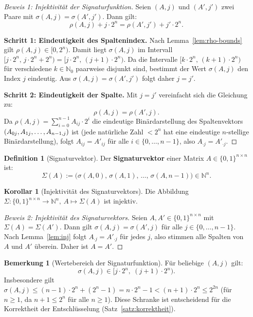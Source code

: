 ﻿\documentclass[a4paper,12pt]{scrreprt}
\theoremstyle{definition}
\newtheorem{definition}{Definition}[section]
\newtheorem{bemerkung}{Bemerkung}[section]
\newtheorem{korollar}{Korollar}[section]
\begin{document}
\begin{proof}[Beweis 1: Injektivität der Signaturfunktion]
	Seien $(A, j)$ und $(A', j')$ zwei Paare mit $\sigma(A,j) = \sigma(A',j')$. Dann gilt:
	\[
	\rho(A,j) + j \cdot 2^n = \rho(A',j') + j' \cdot 2^n.
	\]
	
	\textbf{Schritt 1: Eindeutigkeit des Spaltenindex.}
	Nach Lemma~\ref{lem:rho-bounds} gilt $\rho(A,j) \in [0, 2^n)$. Damit liegt $\sigma(A,j)$ im Intervall $[j \cdot 2^n,\, j \cdot 2^n + 2^n) = [j \cdot 2^n,\, (j+1) \cdot 2^n)$. Da die Intervalle $[k \cdot 2^n,\, (k+1) \cdot 2^n)$ für verschiedene $k \in \mathbb{N}_0$ paarweise disjunkt sind, bestimmt der Wert $\sigma(A,j)$ den Index $j$ eindeutig. Aus $\sigma(A,j) = \sigma(A',j')$ folgt daher $j = j'$.
	
	\textbf{Schritt 2: Eindeutigkeit der Spalte.}
	Mit $j = j'$ vereinfacht sich die Gleichung zu:
	\[
	\rho(A,j) = \rho(A',j).
	\]
	Da $\rho(A,j) = \sum_{i=0}^{n-1} A_{ij} \cdot 2^i$ die eindeutige Binärdarstellung des Spaltenvektors $(A_{0j}, A_{1j}, \ldots, \newline A_{n-1,j})$ ist (jede natürliche Zahl $< 2^n$ hat eine eindeutige $n$-stellige Binärdarstellung), folgt $A_{ij} = A'_{ij}$ für alle $i \in \{0,\ldots,n-1\}$, also $A_{\cdot j} = A'_{\cdot j}$.
\end{proof}

\begin{definition}[Signaturvektor]
	\label{def:sigvec}
	Der \textbf{Signaturvektor} einer Matrix $A \in \{0,1\}^{n \times n}$ ist:
	\[
	\Sigma(A) := \bigl(\sigma(A,0),\, \sigma(A,1),\, \ldots,\, \sigma(A,n-1)\bigr) \in \mathbb{N}^n.
	\]
\end{definition}

\begin{korollar}[Injektivität des Signaturvektors]
	\label{kor:sigma-inj}
	Die Abbildung $\Sigma: \{0,1\}^{n \times n} \to \mathbb{N}^n,\ A \mapsto \Sigma(A)$ ist injektiv.
\end{korollar}

\begin{proof}[Beweis 2: Injektivität des Signaturvektors]
	Seien $A, A' \in \{0,1\}^{n \times n}$ mit $\Sigma(A) = \Sigma(A')$. Dann gilt $\sigma(A,j) = \sigma(A',j)$ für alle $j \in \{0,\ldots,n-1\}$. Nach Lemma~\ref{lem:inj} folgt $A_{\cdot j} = A'_{\cdot j}$ für jedes $j$, also stimmen alle Spalten von $A$ und $A'$ überein. Daher ist $A = A'$.
\end{proof}

\begin{bemerkung}[Wertebereich der Signaturfunktion]
	\label{bem:wertebereich}
	Für beliebige $(A,j)$ gilt:
	\[
	\sigma(A,j) \in [j \cdot 2^n,\; (j+1) \cdot 2^n).
	\]
	Insbesondere gilt $\sigma(A,j) \leq (n-1) \cdot 2^n + (2^n - 1) = n \cdot 2^n - 1 < (n+1) \cdot 2^n \leq 2^{2n}$
	(für $n \geq 1$, da $n+1 \leq 2^n$ für alle $n \geq 1$). Diese Schranke ist entscheidend für die Korrektheit der Entschlüsselung (Satz~\ref{satz:korrektheit}).
\end{bemerkung}
\end{document}
